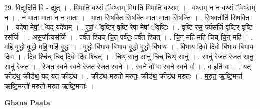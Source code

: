 \documentclass[17pt]{extarticle}
\begin{document}
29. वि॒द्युदिति॑ वि - द्युत् । . मि॒मा॒ति॒ व॒थ्सं ॅव॒थ्सम् मि॑माति मिमाति व॒थ्सम् । . व॒थ्सम् न न व॒थ्सं ॅव॒थ्सम् न । . न मा॒ता मा॒ता न न मा॒ता । . मा॒ता सि॑षक्ति सिषक्ति मा॒ता मा॒ता सि॑षक्ति । . सि॒ष॒क्तीति॑ सिषक्ति । . यदे॑षा मेषां॒ ॅयद् यदे॑षाम् । . ए॒षां॒ ॅवृ॒ष्टिर् वृ॒ष्टि रे॑षा मेषां ॅवृ॒ष्टिः । . वृ॒ष्टि रस॒ र्ज्यस॑र्जि वृ॒ष्टिर् वृ॒ष्टि रस॑र्जि । . अस॒र्जीत्यस॑र्जि । . पर्व॑त श्चिच् चि॒त् पर्व॑तः॒ पर्व॑त श्चित् । . चि॒न् महि॒ महि॑ चिच् चि॒न् महि॑ । . महि॑ वृ॒द्धो वृ॒द्धो महि॒ महि॑ वृ॒द्धः । . वृ॒द्धो बि॑भाय बिभाय वृ॒द्धो वृ॒द्धो बि॑भाय । . बि॒भा॒य॒ दि॒वो दि॒वो बि॑भाय बिभाय दि॒वः । . दि॒व श्चि॑च् चिद् दि॒वो दि॒व श्चि॑त् । . चि॒थ् सानु॒ सानु॑ चिच् चि॒थ् सानु॑ । . सानु॑ रेजत रेजत॒ सानु॒ सानु॑ रेजत । . रे॒ज॒त॒ स्व॒ने स्व॒ने रे॑जत रेजत स्व॒ने । . स्व॒ने वो॑ वः स्व॒ने स्व॒ने वः॑ । . व॒ इति॑ वः । . यत् क्रीड॑थ॒ क्रीड॑थ॒ यद् यत् क्रीड॑थ । . क्रीड॑थ मरुतो मरुतः॒ क्रीड॑थ॒ क्रीड॑थ मरुतः । . म॒रु॒त॒ ऋ॒ष्टि॒मन्त॑ ऋष्टि॒मन्तो॑ मरुतो मरुत ऋष्टि॒मन्तः॑ । \newline

\textbf{Ghana Paata } \newline
\end{document}
